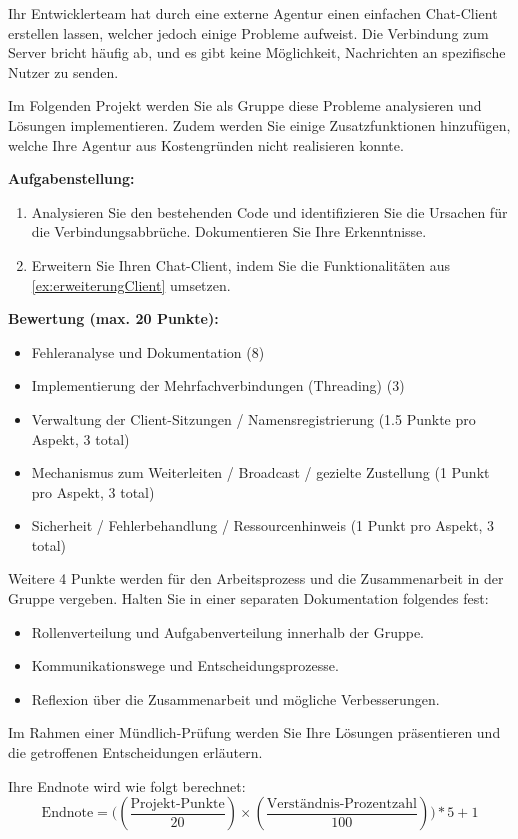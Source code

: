 \begin{myexercise}
    Ihr Entwicklerteam hat durch eine externe Agentur einen einfachen Chat-Client erstellen lassen, welcher jedoch einige Probleme aufweist. Die Verbindung zum Server bricht häufig ab, und es gibt keine Möglichkeit, Nachrichten an spezifische Nutzer zu senden. 

    Im Folgenden Projekt werden Sie als Gruppe diese Probleme analysieren und Lösungen implementieren. Zudem werden Sie einige Zusatzfunktionen hinzufügen, welche Ihre Agentur aus Kostengründen nicht realisieren konnte.

    \textbf{Aufgabenstellung:}
    \begin{enumerate}
        \item Analysieren Sie den bestehenden Code und identifizieren Sie die Ursachen für die Verbindungsabbrüche. Dokumentieren Sie Ihre Erkenntnisse.
        \item Erweitern Sie Ihren Chat-Client, indem Sie die Funktionalitäten aus \cref{ex:erweiterungClient} umsetzen.
    \end{enumerate} 

    \textbf{Bewertung (max. 20 Punkte):}
    \begin{itemize}
        \item Fehleranalyse und Dokumentation (8)
        \item Implementierung der Mehrfachverbindungen (Threading) (3)
        \item Verwaltung der Client-Sitzungen / Namensregistrierung (1.5 Punkte pro Aspekt, 3 total)
        \item Mechanismus zum Weiterleiten / Broadcast / gezielte Zustellung (1 Punkt pro Aspekt, 3 total)
        \item Sicherheit / Fehlerbehandlung / Ressourcenhinweis (1 Punkt pro Aspekt, 3 total)
    \end{itemize}

    Weitere 4 Punkte werden für den Arbeitsprozess und die Zusammenarbeit in der Gruppe vergeben. Halten Sie in einer separaten Dokumentation folgendes fest:
    \begin{itemize}
        \item Rollenverteilung und Aufgabenverteilung innerhalb der Gruppe.
        \item Kommunikationswege und Entscheidungsprozesse.
        \item Reflexion über die Zusammenarbeit und mögliche Verbesserungen.
    \end{itemize}

    Im Rahmen einer Mündlich-Prüfung werden Sie Ihre Lösungen präsentieren und die getroffenen Entscheidungen erläutern.

    Ihre Endnote wird wie folgt berechnet:
    \[\text{Endnote} = \Bigg(\left(\frac{\text{Projekt-Punkte}}{20}\right) \times \left(\frac{\text{Verständnis-Prozentzahl}}{100}\right)\Bigg)*5+1\]
\end{myexercise}


